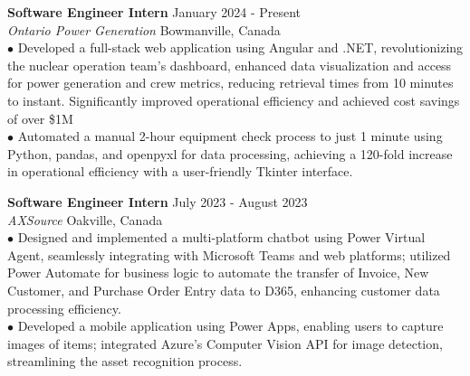 \documentclass[letterpaper,12pt]{article}
\begin{document}
\textbf{Software Engineer Intern} \hfill January 2024 - Present \\
\textit{Ontario Power Generation} \hfill Bowmanville, Canada
\vspace{0.25cm} \\
\hspace{0.1cm} $\bullet$ \hspace{0.21em}Developed a full-stack web application using Angular and .NET, revolutionizing the nuclear operation team's dashboard, enhanced data visualization and access for power generation and crew metrics, reducing retrieval times from 10 minutes to instant. Significantly improved operational efficiency and achieved cost savings of over \$1M\\ 
\hspace{0.1cm} $\bullet$ \hspace{0.2em}Automated a manual 2-hour equipment check process to just 1 minute using Python, pandas, and openpyxl for data processing, achieving a 120-fold increase in operational efficiency with a user-friendly Tkinter interface.

\textbf{Software Engineer Intern}  \hfill   July 2023 - August 2023 \\
\textit{AXSource} \hfill Oakville, Canada
\vspace{0.3cm}  
\\\hspace{0.1cm} $\bullet$ \hspace{0.3em}Designed and implemented a multi-platform chatbot using Power Virtual Agent, seamlessly integrating with Microsoft Teams and web platforms; utilized Power Automate for business logic to automate the transfer of Invoice, New Customer, and Purchase Order Entry data to D365, enhancing customer data processing efficiency.\\
\hspace{0.1cm} $\bullet$ \hspace{0.35em}Developed a mobile application using Power Apps, enabling users to capture images of items; integrated Azure's Computer Vision API for image detection, streamlining the asset recognition process. 
\end{document}
